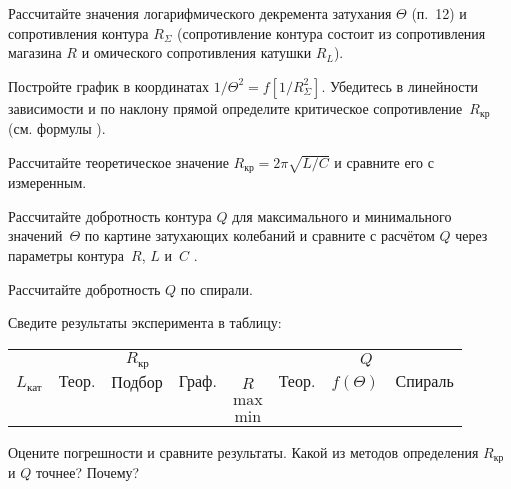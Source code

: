 \begin{lab:task}
	\item Рассчитайте значения логарифмического декремента 
    затухания $\Theta$ (п.~12) и сопротивления контура $R_{\Sigma}$ 
    (сопротивление контура состоит из сопротивления магазина $R$ и 
    омического сопротивления катушки $R_L$).

Постройте график в координатах $1/\Theta^2 =f[1/R^2_{\Sigma}]$. 
Убедитесь в линейности зависимости и по наклону прямой 
определите критическое сопротивление~$R_\text{кр}$ (см.
формулы ). 

	\item Рассчитайте теоретическое значение $R_\text{кр} = 2\pi\sqrt{L / C}$
и сравните его с измеренным.

	\item Рассчитайте добротность контура $Q$ для максимального и минимального
значений~$\Theta$ по картине затухающих колебаний и сравните с расчётом $Q$
через параметры контура~$R$, $L$ и~$C$  .

	\item Рассчитайте добротность $Q$ по спирали.

	\item Сведите результаты эксперимента в таблицу:

\begin{center}\small
\begin{tabular}{|c|c|c|c|c|c|c|c|}
\hline
& \multicolumn{3}{c|}{$R_{\text{кр}}$} &  & \multicolumn{3}{c|}{$Q$} \\
\cline{2-4}
\cline{6-8}
$L_{\text{кат}}$ & $\text{Теор.}$ & $\text{Подбор}$ & $\text{Граф.}$ & $R$ &
$\text{Теор.}$ & $f(\Theta)$ & $\text{Спираль}$  \\
\hline
& & & & $\text{max}$ & & &  \\
& & & & $\text{min}$ & & &  \\
\hline
\end{tabular}
\end{center}

	\item Оцените погрешности и сравните результаты. Какой из методов
определения $R_\text{кр}$ и $Q$ точнее? Почему?

\end{lab:task}


